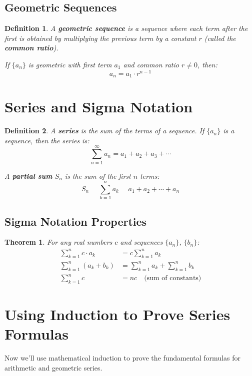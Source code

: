 \documentclass[12pt]{article}
\newtheorem{definition}{Definition}
\newtheorem{theorem}{Theorem}
\begin{document}
\subsection{Geometric Sequences}

\begin{definition}
A \textbf{geometric sequence} is a sequence where each term after the first is obtained by multiplying the previous term by a constant $r$ (called the \textbf{common ratio}).

If $\{a_n\}$ is geometric with first term $a_1$ and common ratio $r \neq 0$, then:
$$a_n = a_1 \cdot r^{n-1}$$
\end{definition}

\section{Series and Sigma Notation}

\begin{definition}
A \textbf{series} is the sum of the terms of a sequence. If $\{a_n\}$ is a sequence, then the series is:
$$\sum_{n=1}^{\infty} a_n = a_1 + a_2 + a_3 + \cdots$$

A \textbf{partial sum} $S_n$ is the sum of the first $n$ terms:
$$S_n = \sum_{k=1}^{n} a_k = a_1 + a_2 + \cdots + a_n$$
\end{definition}

\subsection{Sigma Notation Properties}

\begin{theorem}
For any real numbers $c$ and sequences $\{a_n\}$, $\{b_n\}$:
\begin{align}
\sum_{k=1}^{n} c \cdot a_k &= c \sum_{k=1}^{n} a_k \\
\sum_{k=1}^{n} (a_k + b_k) &= \sum_{k=1}^{n} a_k + \sum_{k=1}^{n} b_k \\
\sum_{k=1}^{n} c &= nc \quad \text{(sum of constants)}
\end{align}
\end{theorem}

\section{Using Induction to Prove Series Formulas}

Now we'll use mathematical induction to prove the fundamental formulas for arithmetic and geometric series.
\end{document}
